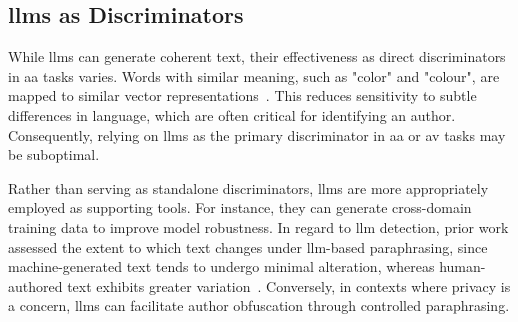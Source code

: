 \subsection{\acsp{llm} as Discriminators}
\label{subsec:llm_discriminator}

While \acp{llm} can generate coherent text, their effectiveness as direct discriminators in \ac{aa} tasks varies. 
Words with similar meaning, such as "color" and "colour", are mapped to similar vector representations~\citep{altakrori_topic_2021}.
This reduces sensitivity to subtle differences in language, which are often critical for identifying an author. 
Consequently, relying on \acp{llm} as the primary discriminator in \ac{aa} or \ac{av} tasks may be suboptimal.

Rather than serving as standalone discriminators, \acp{llm} are more appropriately employed as supporting tools. 
For instance, they can generate cross-domain training data to improve model robustness. 
In regard to \ac{llm} detection, prior work assessed the extent to which text changes under \ac{llm}-based paraphrasing, since machine-generated text tends to undergo minimal alteration, whereas human-authored text exhibits greater variation~\citep{mao_raidar_2024}.
Conversely, in contexts where privacy is a concern, \acp{llm} can facilitate author obfuscation through controlled paraphrasing. 